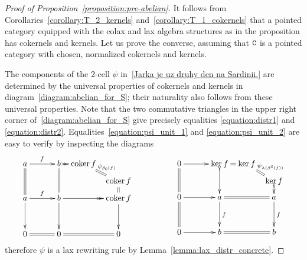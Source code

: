 \documentclass[12pt,leqno]{amsart}
\theoremstyle{definition}
\newcommand{\C}{{\tt C}}
\newcommand{\4}{\texttt{4}}
\DeclareMathOperator{\coker}{coker}
\begin{document}
\begin{proof}[Proof of Proposition~\ref{proposition:pre-abelian}] 
It follows from Corollaries~\ref{corollary:T_2_kernels} 
and~\ref{corollary:T_1_cokernels} that a pointed category equipped
with the colax and lax algebra structures as in the proposition
has cokernels and kernels. Let us prove the converse, assuming that
$\C$ is a pointed category with chosen, normalized cokernels and kernels. 

The components of the 2-cell $\psi$ in~\eqref{Jarka je uz druhy den na
  Sardinii.} are determined by the universal
properties of cokernels and kernels in
diagram~\eqref{diagram:abelian_for_S};  their naturality also
follows from these universal properties. Note that the two commutative
triangles in the upper right corner 
of~\eqref{diagram:abelian_for_S} give precisely
equalities \eqref{equation:distr1} and
\eqref{equation:distr2}. Equalities~\eqref{equation:psi_unit_1} and
\eqref{equation:psi_unit_2} are easy to verify by inspecting the 
diagrams
\[
\xymatrix@R=.6em@C=.6em{
a \ar@{=}[dd]   \ar[rrr]^f&&&b\ar@{=}[dd]  \ar@{->>}[r]  &\coker f
\ar@{=}[rd]^{\psi_{\beta_\C(f)}}
\\
&&&&& \coker f \ar@{=}[d]
\\
a \ar[ddd] \ar[rrr]^f &&&b \ar[ddd] \ar@{->>}[rr]  &&\coker f \ar[ddd]
\\
\\
\\
0 \ar@{=}[rrr]&&& 0 \ar@{=}[rr]&&0
}
\hskip 5em
\xymatrix@R=.6em@C=.6em{
0 \ar@{=}[dd] \ar[rrr]  &&&\ker f\ar@{>->}[dd]  \ar@{=}[r]  &\ker f
\ar@{=}[rd]^{\psi_{\lambda(\beta^\C(f))}}
\\
&&&&& \ker f \ar@{>->}[d]
\\
0 \ar@{=}[ddd] \ar[rrr] &&&a \ar[ddd]^f \ar@{=}[rr]  &&a \ar[ddd]^f
\\
\\
\\
0 \ar[rrr]&&& b \ar@{=}[rr]&&b
}
\]
therefore $\psi$ is a lax rewriting rule by 
Lemma~\ref{lemma:lax_distr_concrete}.


\end{proof}
\end{document}
